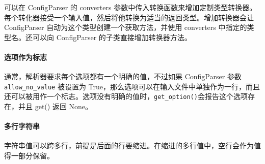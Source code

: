 可以在 ConfigParser 的 converters 参数中传入转换函数来增加定制类型转换器。每个转化器接受一个输入值，然后将他转换为适当的返回类型。增加转换器会让 ConfigParser 自动为这个类型创建一个获取方法，并使用 converters 中指定的类型名。还可以向 ConfigParser 的子类直接增加转换器方法。

\paragraph{选项作为标志} 通常，解析器要求每个选项都有一个明确的值，不过如果 ConfigParser 参数 \verb|allow_no_value| 被设置为 True，那么选项可以在输入文件中单独作为一行，而且还可以被用作一个标志。选项没有明确的值时，\verb|get_option()|会报告这个选项存在，并且 get() 返回 None。
\paragraph{多行字符串} 字符串值可以跨多行，前提是后面的行要缩进。在缩进的多行值中，空行会作为值得一部分保留。
